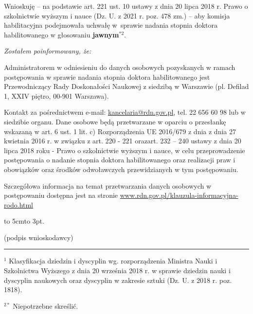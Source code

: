 \begin{fullwidth}
\noindent Wnioskuję -- na podstawie art. 221 ust. 10 ustawy z dnia 20 lipca 2018 r. Prawo o szkolnictwie wyższym i nauce (Dz. U. z 2021 r. poz. 478 zm.) – aby komisja habilitacyjna podejmowała uchwałę w~sprawie nadania stopnia doktora habilitowanego w głosowaniu \textbf{jawnym}$^{*2}$.\vspace{1em}

\begin{minipage}{45em}
\it
Zostałem poinformowany, że:

Administratorem w odniesieniu do danych osobowych pozyskanych w ramach postępowania w sprawie nadania stopnia doktora habilitowanego jest Przewodniczący Rady Doskonałości Naukowej z siedzibą w Warszawie (pl. Defilad 1, XXIV piętro, 00-901 Warszawa).

Kontakt za pośrednictwem e-mail: \url{kancelaria@rdn.gov.pl}, tel. 22 656 60 98 lub w siedzibie organu. Dane osobowe będą przetwarzane w oparciu o przesłankę wskazaną w art. 6 ust. 1 lit. c) Rozporządzenia UE 2016/679 z dnia z dnia 27 kwietnia 2016 r. w związku z art. 220 - 221 orazart. 232 – 240 ustawy z dnia 20 lipca 2018 roku - Prawo o szkolnictwie wyższym i nauce, w celu przeprowadzenie postępowania o nadanie stopnia doktora habilitowanego oraz realizacji praw i obowiązków oraz środków odwoławczych przewidzianych w tym postępowaniu.

Szczegółowa informacja na temat przetwarzania danych osobowych w postępowaniu dostępna jest na stronie \url{www.rdn.gov.pl/klauzula-informacyjna-rodo.html}
\end{minipage}

\vspace{5em}
\vfill\noindent\hspace{.75\textwidth}\begin{minipage}{15em}
\begin{center}
	\hbox to 5cm{\leaders\hbox to 3pt{\hss . \hss}\hfil}

	(podpis wnioskodawcy)
\end{center}
\end{minipage}

\vfill\noindent\begin{minipage}{50em}
\footnotesize\rule{15em}{.5pt}

$^{1}$ Klasyfikacja dziedzin i dyscyplin wg. rozporządzenia Ministra Nauki i Szkolnictwa Wyższego z dnia 20 września 2018 r. w sprawie dziedzin nauki i dyscyplin naukowych oraz dyscyplin w zakresie sztuki (Dz. U. z 2018 r. poz. 1818).

$^{2*}$ Niepotrzebne skreślić.
	

\end{minipage}
\end{fullwidth}
